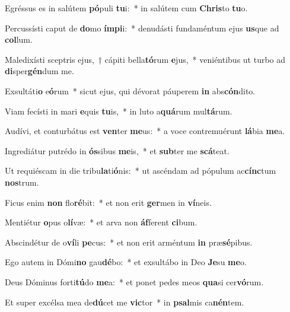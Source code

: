 \item Egréssus es in salútem \textbf{pó}puli \textbf{tu}i:~* in salútem cum \textbf{Chris}to \textbf{tu}o.
\item Percussísti caput de \textbf{do}mo \textbf{ím}\textbf{pi}i:~* denudásti fundaméntum ejus \textbf{us}que ad \textbf{col}lum.
\item Maledixísti sceptris ejus,~† cápiti bella\textbf{tó}rum \textbf{e}jus,~* veniéntibus ut turbo ad \textbf{di}sper\textbf{gén}dum me.
\item Exsultáti\textbf{o} e\textbf{ó}rum~* sicut ejus, qui dévorat páuperem \textbf{in} abs\textbf{cón}dito.
\item Viam fecísti in mari \textbf{e}quis \textbf{tu}is,~* in luto a\textbf{quá}rum mul\textbf{tá}rum.
\item Audívi, et conturbátus est \textbf{ven}ter \textbf{me}us:~* a voce contremuérunt \textbf{lá}bia \textbf{me}a.
\item Ingrediátur putrédo in \textbf{ós}sibus \textbf{me}is,~* et \textbf{sub}ter me \textbf{scá}teat.
\item Ut requiéscam in die tribu\textbf{la}ti\textbf{ó}nis:~* ut ascéndam ad pópulum ac\textbf{cínc}tum \textbf{nos}trum.
\item Ficus enim \textbf{non} flo\textbf{ré}bit:~* et non erit \textbf{ger}men in \textbf{ví}neis.
\item Mentiétur \textbf{o}pus o\textbf{lí}væ:~* et arva non \textbf{áf}ferent \textbf{ci}bum.
\item Abscindétur de o\textbf{ví}li \textbf{pe}cus:~* et non erit arméntum \textbf{in} præ\textbf{sé}pibus.
\item Ego autem in Dómi\textbf{no} gau\textbf{dé}bo:~* et exsultábo in Deo \textbf{Je}su \textbf{me}o.
\item Deus Dóminus forti\textbf{tú}do \textbf{me}a:~* et ponet pedes meos \textbf{qua}si cer\textbf{vó}rum.
\item Et super excélsa mea de\textbf{dú}cet me \textbf{vic}tor~* in \textbf{psal}mis ca\textbf{nén}tem.
